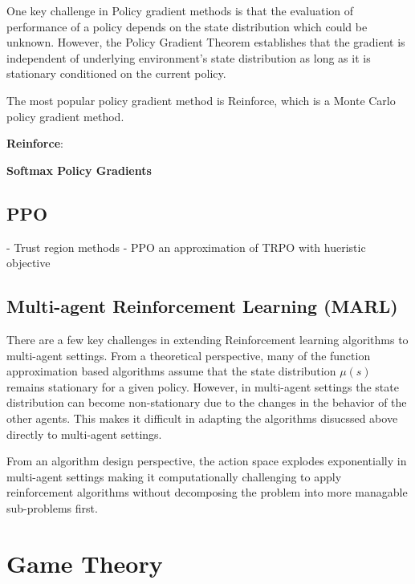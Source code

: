 One key challenge in Policy gradient methods is that the evaluation of performance of a policy
depends on the state distribution which could be unknown.
However, the Policy Gradient Theorem establishes that the gradient is independent of underlying
environment's state distribution as long as it is stationary conditioned on the current policy.

The most popular policy gradient method is Reinforce, which is a Monte Carlo policy gradient
method.

\textbf{Reinforce}: 

\textbf{Softmax Policy Gradients}


\subsection{PPO}

- Trust region methods
- PPO an approximation of TRPO with hueristic objective

\subsection{Multi-agent Reinforcement Learning (MARL)}

There are a few key challenges in extending Reinforcement learning algorithms to multi-agent
settings.
From a theoretical perspective, many of the function approximation based algorithms assume that the
state distribution $\mu(s)$ remains stationary for a given policy.
However, in multi-agent settings the state distribution can become non-stationary due to the
changes in the behavior of the other agents.
This makes it difficult in adapting the algorithms disucssed above directly to multi-agent
settings.

From an algorithm design perspective, the action space explodes exponentially in multi-agent
settings making it computationally challenging to apply reinforcement algorithms without
decomposing the problem into more managable sub-problems first.

\section{Game Theory}

